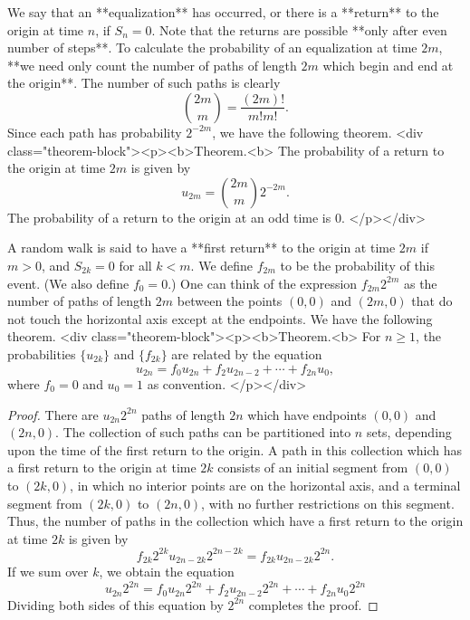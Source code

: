 We say that an **equalization** has occurred, or there is a **return** to the origin at time $n$, if $S_n = 0$. Note that the returns are possible **only after even number of steps**. To calculate
the probability of an equalization at time $2m$, **we need only count the number of paths of length $2m$ which begin and end at the origin**. The number of such paths is clearly
$$\begin{equation}
    \binom{2m}{m} = \frac{(2m)!}{m! m!}.
\end{equation}$$
Since each path has probability $2^{-2m}$, we have the following theorem.
<div class="theorem-block"><p><b>Theorem.<b> 
The probability of a return to the origin at time $2m$ is given by
$$\begin{equation}
    u_{2 m}= \binom{2m}{m} 2^{-2 m}.
\end{equation}$$
The probability of a return to the origin at an odd time is 0.
</p></div>

A random walk is said to have a **first return** to the origin at time $2m$ if $m > 0$, and $S_{2k} = 0$ for all $k < m$. We define $f_{2m}$ to be the probability of this event. (We also define $f_0 = 0$.) One can think
of the expression $f_{2m}2^{2m}$ as the number of paths of length $2m$ between the points $(0, 0)$ and $(2m, 0)$ that do not touch the horizontal axis except at the endpoints. We have the following theorem.
<div class="theorem-block"><p><b>Theorem.<b> 
For $n \geq 1$, the probabilities $\{u_{2k}\}$ and $\{f_{2k}\}$ are related by the equation
$$\begin{equation}
    u_{2 n}=f_{0} u_{2 n}+f_{2} u_{2 n-2}+\cdots+f_{2 n} u_{0},
\end{equation}$$
where $f_0 = 0$ and $u_0 = 1$ as convention.
</p></div>

\begin{proof}
There are $u_{2n}2^{2n}$ paths of length $2n$ which have endpoints $(0, 0)$ and $(2n, 0)$. The collection of such paths can be partitioned into $n$ sets, depending upon the time of the first return to the origin. A path in this collection which has a first return to the origin at time $2k$ consists of an initial segment from $(0, 0)$ to $(2k, 0)$, in which no interior points are on the horizontal axis, and a terminal segment from $(2k, 0)$
to $(2n, 0)$, with no further restrictions on this segment. Thus, the number of paths in the collection which have a first return to the origin at time $2k$ is given by
$$\begin{equation}
    f_{2 k} 2^{2 k} u_{2 n-2 k} 2^{2 n-2 k}=f_{2 k} u_{2 n-2 k} 2^{2 n}.
\end{equation}$$
If we sum over $k$, we obtain the equation
$$\begin{equation}
    u_{2 n} 2^{2 n}=f_{0} u_{2 n} 2^{2 n}+f_{2} u_{2 n-2} 2^{2 n}+\cdots+f_{2 n} u_{0} 2^{2 n}
\end{equation}$$
Dividing both sides of this equation by $2^{2n}$ completes the proof.
\end{proof}

